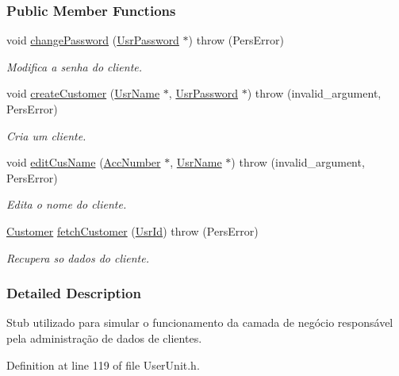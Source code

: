 \subsubsection*{Public Member Functions}
\begin{DoxyCompactItemize}
\item 
void \hyperlink{classStubUserCusAdm_a7e44bec3dc4fb0640e6eb418dd8e8320}{change\-Password} (\hyperlink{classUsrPassword}{Usr\-Password} $\ast$)  throw (\-Pers\-Error)
\begin{DoxyCompactList}\small\item\em Modifica a senha do cliente. \end{DoxyCompactList}\item 
void \hyperlink{classStubUserCusAdm_a53dc0deb3cf26a09c2814504b0daab63}{create\-Customer} (\hyperlink{classUsrName}{Usr\-Name} $\ast$, \hyperlink{classUsrPassword}{Usr\-Password} $\ast$)  throw (invalid\-\_\-argument, Pers\-Error)
\begin{DoxyCompactList}\small\item\em Cria um cliente. \end{DoxyCompactList}\item 
void \hyperlink{classStubUserCusAdm_a84ca3047ccb0ac2e371a23c4e4fcdba0}{edit\-Cus\-Name} (\hyperlink{classAccNumber}{Acc\-Number} $\ast$, \hyperlink{classUsrName}{Usr\-Name} $\ast$)  throw (invalid\-\_\-argument, Pers\-Error)
\begin{DoxyCompactList}\small\item\em Edita o nome do cliente. \end{DoxyCompactList}\item 
\hyperlink{classCustomer}{Customer} \hyperlink{classStubUserCusAdm_aac14b018a6284211b1c83c48a9529efe}{fetch\-Customer} (\hyperlink{classUsrId}{Usr\-Id})  throw (\-Pers\-Error)
\begin{DoxyCompactList}\small\item\em Recupera so dados do cliente. \end{DoxyCompactList}\end{DoxyCompactItemize}


\subsubsection{Detailed Description}
Stub utilizado para simular o funcionamento da camada de negócio responsável pela administração de dados de clientes. 

Definition at line 119 of file User\-Unit.\-h.



